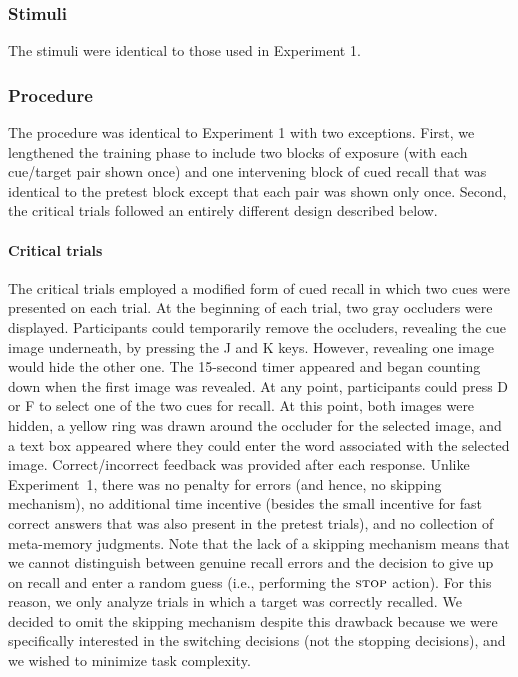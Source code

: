 \subsubsection{Stimuli}

The stimuli were identical to those used in Experiment 1.

\subsubsection{Procedure}

The procedure was identical to Experiment 1 with two exceptions. First, we lengthened the training phase to include two blocks of exposure (with each cue/target pair shown once) and one intervening block of cued recall that was identical to the pretest block except that each pair was shown only once. Second, the critical trials followed an entirely different design described below.

\paragraph{Critical trials} The critical trials employed a modified form of cued recall in which two cues were presented on each trial. At the beginning of each trial, two gray occluders were displayed. Participants could temporarily remove the occluders, revealing the cue image underneath, by pressing the J and K keys. However, revealing one image would hide the other one. The 15-second timer appeared and began counting down when the first image was revealed. At any point, participants could press D or F to select one of the two cues for recall. At this point, both images were hidden, a yellow ring was drawn around the occluder for the selected image, and a text box appeared where they could enter the word associated with the selected image. Correct/incorrect feedback was provided after each response. Unlike Experiment~1, there was no penalty for errors (and hence, no skipping mechanism), no additional time incentive (besides the small incentive for fast correct answers that was also present in the pretest trials), and no collection of meta-memory judgments. Note that the lack of a skipping mechanism means that we cannot distinguish between genuine recall errors and the decision to give up on recall and enter a random guess (i.e., performing the $\textsc{stop}$ action). For this reason, we only analyze trials in which a target was correctly recalled. We decided to omit the skipping mechanism despite this drawback because we were specifically interested in the switching decisions (not the stopping decisions), and we wished to minimize task complexity.


